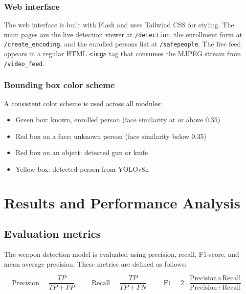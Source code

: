 \documentclass[12pt,a4paper]{report}
\begin{document}

\subsection{Web interface}

The web interface is built with Flask and uses Tailwind CSS for styling. The main pages are the live detection viewer at \texttt{/detection}, the enrollment form at \texttt{/create\_encoding}, and the enrolled persons list at \texttt{/safepeople}. The live feed appears in a regular HTML \texttt{<img>} tag that consumes the MJPEG stream from \texttt{/video\_feed}.

\subsection{Bounding box color scheme}

A consistent color scheme is used across all modules:

\begin{itemize}
    \item Green box: known, enrolled person (face similarity at or above 0.35)
    \item Red box on a face: unknown person (face similarity below 0.35)
    \item Red box on an object: detected gun or knife
    \item Yellow box: detected person from YOLOv8n
\end{itemize}


\chapter{Results and Performance Analysis}

\section{Evaluation metrics}

The weapon detection model is evaluated using precision, recall, F1-score, and mean average precision. These metrics are defined as follows:

\[
\text{Precision} = \frac{TP}{TP + FP}, \qquad
\text{Recall} = \frac{TP}{TP + FN}, \qquad
\text{F1} = 2 \cdot \frac{\text{Precision} \times \text{Recall}}{\text{Precision} + \text{Recall}}
\]
\end{document}
